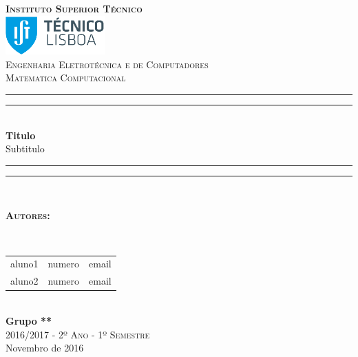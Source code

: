 \documentclass[12pt]{article}
\begin{document}
\begin{titlepage}
	
\thispagestyle{empty}
\newcommand{\HRule}{\rule{\linewidth}{0.5mm}} %
\center
\textsc{\bfseries\LARGE Instituto Superior Técnico}\\[1cm] %
\includegraphics[height=1.5cm]{IST_Logo.eps}\\[2.5cm]
\textsc{\Large Engenharia Eletrotécnica e de Computadores}\\[0.5cm] %
\textsc{\large Matematica Computacional }\\[0.5cm] %

\rule{\textwidth}{1.6pt}\vspace*{-\baselineskip}\vspace*{2pt} %
\rule{\textwidth}{0.4pt}\\[\baselineskip] %

{\Huge \bfseries Titulo}\\[0.2cm]
{\large Subtitulo}\\[0.2cm] %

\rule{\textwidth}{0.4pt}\vspace*{-\baselineskip}\vspace{3.2pt} %
\rule{\textwidth}{1.6pt}\\[1.5cm]


\begin{minipage}{0.9\textwidth}
	\begin{flushleft} \large
		\begin{Large}\bfseries\textsc{Autores:}\end{Large}\\[0.4cm]
		\begin{tabular}{l l l} 
			
			aluno1 & numero & \normalsize email \\ 
			aluno2 & numero & \normalsize email \\ 
			
		\end{tabular}
	\end{flushleft}
\end{minipage}\\[0.5cm]


{\bfseries Grupo **}\\[2cm]
\large\textsc{ 2016/2017 - 2º Ano - 1º Semestre}\\
\large Novembro de 2016\\[1cm]


\end{titlepage}
\end{document}
